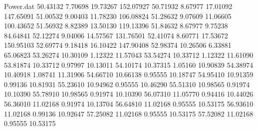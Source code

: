 \begin{filecontents}{Power.dat}
  50.43132    7.70698   19.73267  152.07927
  50.71932    8.67977   17.01092  147.65091
  51.00532    9.00403   11.78230  106.08824
  51.28632    9.07609   11.06605  100.43652
  51.56932    8.82389   13.50130  119.13396
  51.84632    8.67977    9.75238   84.64841
  52.12274    9.04006   14.57567  131.76501
  52.41074    8.60771   17.53672  150.95103
  52.69774    9.18418   16.10422  147.90408
  52.98374   10.26506    6.33881   65.06823
  53.26274   10.30109    1.12322   11.57043
  53.54274   10.33712    1.12322   11.61090
  53.81874   10.33712    0.97997   10.13011
  54.10174   10.37315    1.05160   10.90839
  54.38974   10.40918    1.08741   11.31906
  54.66710   10.66138    0.95555   10.18747
  54.95410   10.91359    0.99136   10.81931
  55.23610   10.94962    0.95555   10.46290
  55.51310   10.98565    0.91974   10.10390
  55.78910   10.98565    0.91974   10.10390
  56.07310   11.05770    0.94416   10.44026
  56.36010   11.02168    0.91974   10.13704
  56.64810   11.02168    0.95555   10.53175
  56.93610   11.02168    0.99136   10.92647
  57.25082   11.02168    0.95555   10.53175
  57.52082   11.02168    0.95555   10.53175
\end{filecontents}
